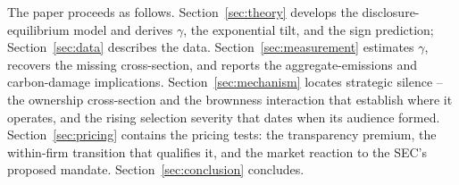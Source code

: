 \documentclass[a4paper,12pt]{article}
\newcommand{\citet}[1]{\textcite{#1}}
\begin{document}
The paper proceeds as follows. Section~\ref{sec:theory} develops the disclosure-equilibrium model and derives $\gamma$, the exponential tilt, and the sign prediction; Section~\ref{sec:data} describes the data. Section~\ref{sec:measurement} estimates $\gamma$, recovers the missing cross-section, and reports the aggregate-emissions and carbon-damage implications. Section~\ref{sec:mechanism} locates strategic silence -- the ownership cross-section and the brownness interaction that establish where it operates, and the rising selection severity that dates when its audience formed. Section~\ref{sec:pricing} contains the pricing tests: the transparency premium, the within-firm transition that qualifies it, and the market reaction to the SEC's proposed mandate. Section~\ref{sec:conclusion} concludes.





\end{document}
